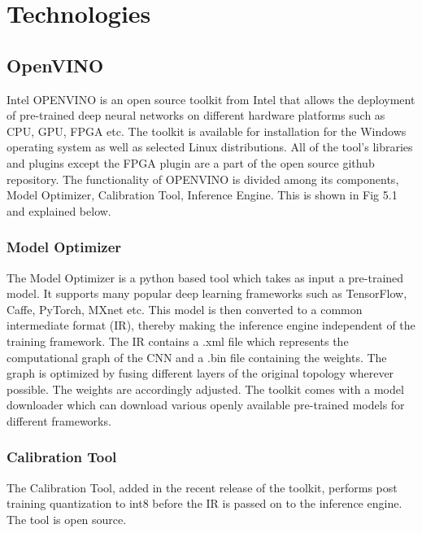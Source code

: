 \documentclass[titlepage]{report}
\begin{document}

\chapter{Technologies}

\section{OpenVINO}
Intel OPENVINO is an open source toolkit from Intel that allows the deployment of pre-trained deep neural networks on different hardware platforms such as CPU, GPU, FPGA etc. The toolkit is available for installation for the Windows operating system as well as selected Linux distributions. All of the tool's libraries and plugins except the FPGA plugin are a part of the open source github repository.
The functionality of OPENVINO is divided among its components, Model Optimizer, Calibration Tool,  Inference Engine. This is shown in Fig 5.1 and explained below. 

\subsection{Model Optimizer}
The Model Optimizer is a python based tool which takes as input a pre-trained model. It supports many popular deep learning frameworks such as TensorFlow, Caffe, PyTorch, MXnet etc. This model is then converted to a common intermediate format (IR), thereby making the inference engine independent of the training framework. The IR contains a .xml file which represents the computational graph of the CNN and a .bin file containing the weights. The graph is optimized by fusing different layers of the original topology wherever possible. The weights are accordingly adjusted. The toolkit comes with a model downloader which can download various openly available pre-trained models for different frameworks.
 
\subsection{Calibration Tool}
 The Calibration Tool, added in the recent release of the toolkit, performs post training quantization to int8 before the IR is passed on to the inference engine.  The tool is open source. 
 
\end{document}
